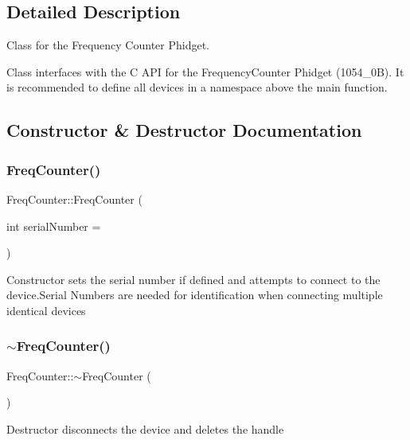 \subsection{Detailed Description}
Class for the Frequency Counter Phidget. 

Class interfaces with the C A\+PI for the Frequency\+Counter Phidget (1054\+\_\+0B). It is recommended to define all devices in a namespace above the main function. 

\subsection{Constructor \& Destructor Documentation}
\mbox{\label{classFreqCounter_ae1d5cc07e50abac7c5a2bbb10da2bb13}} 
\subsubsection{\texorpdfstring{Freq\+Counter()}{FreqCounter()}}
{\footnotesize\ttfamily Freq\+Counter\+::\+Freq\+Counter (\begin{DoxyParamCaption}\item[{int}]{serial\+Number = {} }\end{DoxyParamCaption})\hspace{0.3cm}{\ttfamily [inline]}}

Constructor sets the serial number if defined and attempts to connect to the device.\+Serial Numbers are needed for identification when connecting multiple identical devices\mbox{\label{classFreqCounter_aa4ab538cf30bdaeb27d4da0a934cb62e}} 
\subsubsection{\texorpdfstring{$\sim$\+Freq\+Counter()}{~FreqCounter()}}
{\footnotesize\ttfamily Freq\+Counter\+::$\sim$\+Freq\+Counter (\begin{DoxyParamCaption}{ }\end{DoxyParamCaption})\hspace{0.3cm}{\ttfamily [inline]}}

Destructor disconnects the device and deletes the handle

